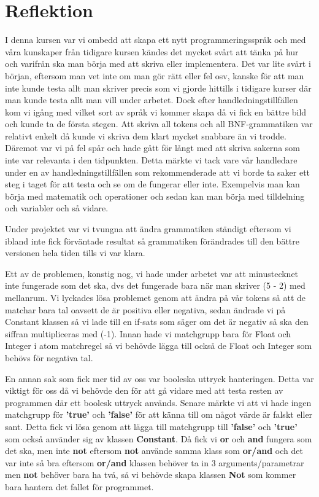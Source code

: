 \documentclass{TDP019mall}
\begin{document}
\section{Reflektion}
I denna kursen var vi ombedd att skapa ett nytt programmeringsspråk och med våra kunskaper från tidigare kursen kändes det mycket svårt
 att tänka på hur och varifrån ska man börja med att skriva eller implementera. Det var lite svårt i början, eftersom man vet inte om man
  gör rätt eller fel osv, kanske för att man inte kunde testa allt man skriver precis som vi gjorde hittills i tidigare kurser där man kunde
   testa allt man vill under arbetet. Dock efter handledningstillfällen kom vi igång med vilket sort av språk vi kommer skapa då vi fick
    en bättre bild och kunde ta de första stegen. Att skriva all tokens och all BNF-grammatiken var relativt enkelt då kunde vi skriva dem
     klart mycket snabbare än vi trodde. Däremot var vi på fel spår och hade gått för långt med att skriva sakerna som inte var relevanta
      i den tidpunkten. Detta märkte vi tack vare vår handledare under en av handledningstillfällen som rekommenderade att vi borde ta saker
       ett steg i taget för att testa och se om de fungerar eller inte. Exempelvis man kan börja med matematik och operationer och sedan kan
        man börja med tilldelning och variabler och så vidare. 

Under projektet var vi tvungna att ändra grammatiken ständigt eftersom vi ibland inte fick förväntade resultat så grammatiken förändrades till 
den bättre versionen hela tiden tills vi var klara. 


Ett av de problemen, konstig nog, vi hade under arbetet var att minustecknet inte fungerade som det ska, dvs det fungerade bara när man skriver 
(5 - 2) med mellanrum. Vi lyckades lösa problemet genom att ändra på vår tokens så att de matchar bara tal oavsett de är positiva eller negativa, 
sedan ändrade vi på Constant klassen så vi lade till en if-sats som säger om det är negativ så ska den siffran multipliceras med (-1). Innan hade vi 
matchgrupp bara för Float och Integer i atom matchregel så vi behövde lägga till också de Float och Integer som behövs för negativa tal.


En annan sak som fick mer tid av oss var booleska uttryck hanteringen. Detta var viktigt för oss då vi behövde den för att gå vidare med att testa 
resten av programmen där ett boolesk uttryck används. Senare märkte vi att vi hade ingen matchgrupp för \textbf{'true'} och \textbf{'false'} för att känna till om något 
värde är falskt eller sant. Detta fick vi lösa genom att lägga till matchgrupp till \textbf{'false'} och \textbf{'true'} som också använder sig av klassen \textbf{Constant}. 
Då fick vi \textbf{or} och \textbf{and} fungera som det ska, men inte \textbf{not} eftersom \textbf{not} använde samma klass som \textbf{or/and} och det var inte så bra eftersom
\textbf{or/and} klassen behöver ta in 3 arguments/parametrar men \textbf{not} behöver bara ha två, så vi behövde skapa klassen \textbf{Not} som kommer bara hantera det fallet
 för programmet.
\end{document}
